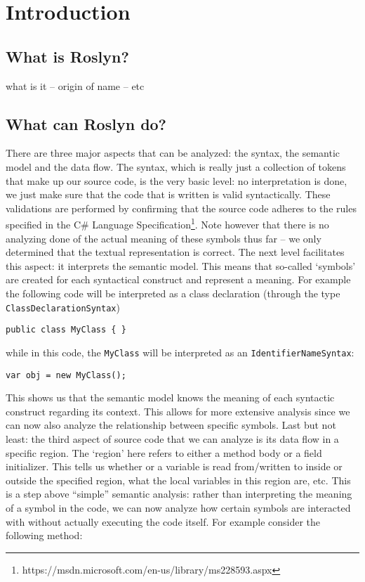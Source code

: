 \chapter{Introduction}
\label{ch:introduction}

\section{What is Roslyn?}
\label{sec:intro-what?}

what is it -- origin of name -- etc

\section{What can Roslyn do?}
\label{sec:intro-what-can}

There are three major aspects that can be analyzed: the syntax, the semantic model and the data flow. 
The syntax, which is really just a collection of tokens that make up our source code, is the very basic level: no interpretation is done, we just make sure that the code that is written is valid syntactically. These validations are performed by confirming that the source code adheres to the rules specified in the C\# Language Specification\footnote{https://msdn.microsoft.com/en-us/library/ms228593.aspx}. Note however that there is no analyzing done of the actual meaning of these symbols thus far – we only determined that the textual representation is correct.
The next level facilitates this aspect: it interprets the semantic model. This means that so-called ‘symbols’ are created for each syntactical construct and represent a meaning. For example the following code will be interpreted as a class declaration (through the type \verb|ClassDeclarationSyntax|)

\begin{lstlisting}
public class MyClass { }
\end{lstlisting}

	
while in this code, the \verb|MyClass| will be interpreted as an \verb|IdentifierNameSyntax|:

   
\begin{lstlisting}
var obj = new MyClass();
\end{lstlisting}  
	
This shows us that the semantic model knows the meaning of each syntactic construct regarding its context. This allows for more extensive analysis since we can now also analyze the relationship between specific symbols. 
Last but not least: the third aspect of source code that we can analyze is its data flow in a specific region. The ‘region’ here refers to either a method body or a field initializer. This tells us whether or a variable is read from/written to inside or outside the specified region, what the local variables in this region are, etc. This is a step above “simple” semantic analysis: rather than interpreting the meaning of a symbol in the code, we can now analyze how certain symbols are interacted with without actually executing the code itself.
For example consider the following method:

